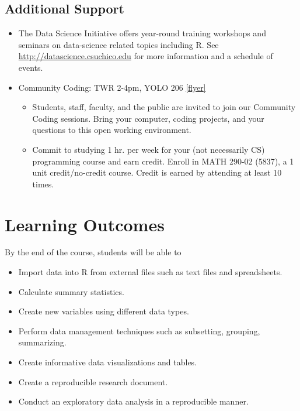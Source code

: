 \documentclass[11pt,]{article}
\providecommand{\tightlist}{%
  \setlength{\itemsep}{0pt}\setlength{\parskip}{0pt}}
\begin{document}
\hypertarget{additional-support}{%
\subsection{Additional Support}\label{additional-support}}

\begin{itemize}
\tightlist
\item
  The Data Science Initiative offers year-round training workshops and
  seminars on data-science related topics including R. See
  \url{http://datascience.csuchico.edu} for more information and a
  schedule of events.\\
\item
  Community Coding: TWR 2-4pm, YOLO 206
  \href{cc_flyer_f19.pdf}{{[}flyer{]}}

  \begin{itemize}
  \tightlist
  \item
    Students, staff, faculty, and the public are invited to join our
    Community Coding sessions. Bring your computer, coding projects, and
    your questions to this open working environment.
  \item
    Commit to studying 1 hr. per week for your (not necessarily CS)
    programming course and earn credit. Enroll in MATH 290-02 (5837), a
    1 unit credit/no-credit course. Credit is earned by attending at
    least 10 times.
  \end{itemize}
\end{itemize}

\hypertarget{learning-outcomes}{%
\section{Learning Outcomes}\label{learning-outcomes}}

By the end of the course, students will be able to

\begin{itemize}
\tightlist
\item
  Import data into R from external files such as text files and
  spreadsheets.
\item
  Calculate summary statistics.
\item
  Create new variables using different data types.
\item
  Perform data management techniques such as subsetting, grouping,
  summarizing.
\item
  Create informative data visualizations and tables.
\item
  Create a reproducible research document.
\item
  Conduct an exploratory data analysis in a reproducible manner.
\end{itemize}
\end{document}
